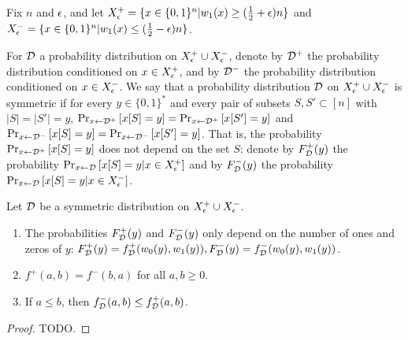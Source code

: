 Fix $n$ and $\epsilon$, and let
$X^+_\epsilon = \{x \in \{0, 1\}^n | w_1(x) \geq (\frac{1}{2}+\epsilon )n \}$
and $X^-_\epsilon = \{x \in \{0, 1\}^n | w_1(x) \leq (\frac{1}{2}-\epsilon )n \}$.

For $\mathcal{D}$ a probability distribution on $X^+_\epsilon \cup X^-_\epsilon$, denote
by $\mathcal{D}^+$ the probability distribution conditioned on $x \in X^+_\epsilon$,
and by $\mathcal{D}^-$ the probability distribution conditioned on $x \in X^-_\epsilon$.
We say that a probability distribution $\mathcal{D}$ on $X^+_\epsilon \cup X^-_\epsilon$ is
symmetric if for every $y \in \{0, 1\}^*$ and every pair of subsets $S, S' \subset [n]$
with $|S| = |S'| = y$, 
$\text{Pr}_{x \leftarrow \mathcal{D}^+}\left[x[S] = y\right] = \text{Pr}_{x \leftarrow \mathcal{D}^+}\left[x[S'] = y\right]$ and
$\text{Pr}_{x \leftarrow \mathcal{D}^-}\left[x[S] = y\right] = \text{Pr}_{x \leftarrow \mathcal{D}^-}\left[x[S'] = y\right]$.
That is, the probability $\text{Pr}_{x \leftarrow \mathcal{D}^+}\left[x[S] = y\right]$ does not depend
on the set $S$: denote by $F_{\mathcal{D}}^+(y)$ the probability
$\text{Pr}_{x \leftarrow \mathcal{D}}\left[x[S] = y | x \in X^+_{\epsilon}\right]$ and by $F_{\mathcal{D}}^-(y)$ the probability
$\text{Pr}_{x \leftarrow \mathcal{D}}\left[x[S] = y | x \in X^-_{\epsilon}\right]$. 

\begin{lemma}
\label{lem:symmetricproperties}
Let $\mathcal{D}$ be a symmetric distribution on $X^+_\epsilon \cup X^-_\epsilon$.

\begin{enumerate}
    \item The probabilities $F_{\mathcal{D}}^+(y)$ and $F_{\mathcal{D}}^-(y)$ only depend on the number of ones and zeros
    of $y$: $F_{\mathcal{D}}^+(y) = f_{\mathcal{D}}^+(w_0(y), w_1(y)), F_{\mathcal{D}}^-(y) = f_{\mathcal{D}}^-(w_0(y), w_1(y))$.
    \item $f^+(a, b) = f^-(b, a)$ for all $a, b \geq 0$. 
    \item If $a \leq b$, then $f^-_{\mathcal{D}}(a, b) \leq f^+_{\mathcal{D}}(a, b)$.
\end{enumerate}
\end{lemma}
\begin{proof}
    TODO.
\end{proof}

